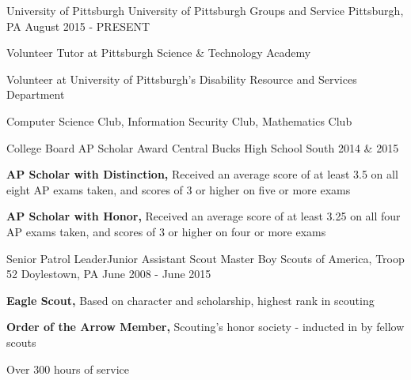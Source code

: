 
\vspace{-1mm}
\begin{cventries}

  \cventry
    {University of Pittsburgh} %
    {University of Pittsburgh Groups and Service} %
    {Pittsburgh, PA} %
    {August 2015 - PRESENT} %
    {
      \begin{cvitems} %
        \item {Volunteer Tutor at Pittsburgh Science \& Technology Academy}
        \item {Volunteer at University of Pittsburgh’s Disability Resource and Services Department}
        \item {Computer Science Club, Information Security Club, Mathematics Club}
      \end{cvitems}
    }

  \cventry
    {College Board} %
    {AP Scholar Award} %
    {Central Bucks High School South} %
    {2014 \& 2015} %
    {
      \begin{cvitems} %
        \item {\textbf{AP Scholar with Distinction,} Received an average score of at least 3.5 on all eight AP exams taken, and scores of 3 or higher on five or more exams}
        \item {\textbf{AP Scholar with Honor,} Received an average score of at least 3.25 on all four AP exams taken, and scores of 3 or higher on four or more exams}
      \end{cvitems}
    }

  \cventry
    {Senior Patrol Leader{\enskip\cdotp\enskip}Junior Assistant Scout Master} %
    {Boy Scouts of America, Troop 52} %
    {Doylestown, PA} %
    {June 2008 - June 2015} %
    {
      \begin{cvitems} %
        \item {\textbf{Eagle Scout,} Based on character and scholarship, highest rank in scouting}
        \item {\textbf{Order of the Arrow Member,} Scouting’s honor society - inducted in by fellow scouts}
        \item {Over 300 hours of service}
      \end{cvitems}
    }


\end{cventries}
